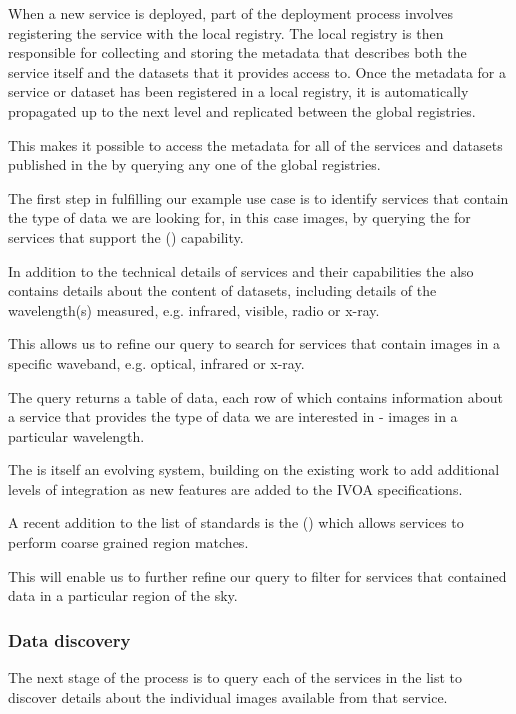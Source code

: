 \documentclass{article}
\begin{document}
When a new service is deployed, part of the deployment process involves
registering the service with the local registry.
The local registry is then responsible for collecting and storing the
metadata that describes both the service itself and the datasets that it
provides access to.
Once the metadata for a service or dataset has been registered in a local
registry, it is automatically propagated up to the next level and replicated
between the global registries.

This makes it possible to access the metadata for all of the services
and datasets published in the \cite{vo} by querying any one of the global
registries.

The first step in fulfilling our example use case is to identify services that
contain the type of data we are looking for, in this case images, by querying
the \cite{ivoa-reg} for services that support the 
(\cite{ivoa-sia}) capability.

In addition to the technical details of services and their capabilities
the \cite{ivoa-reg} also contains details about the content of datasets,
including details of the wavelength(s) measured, e.g. infrared, visible,
radio or x-ray.

This allows us to refine our query to search for \cite{ivoa-sia} services
that contain images in a specific waveband, e.g. optical, infrared or x-ray.

The \cite{ivoa-reg} query returns a table of data, each row of which contains
information about a \cite{ivoa-sia} service that provides the type of data
we are interested in - images in a particular wavelength.

The \cite{vo} is itself an evolving system, building on the existing work
to add additional levels of integration as new features are added to the
IVOA specifications.

A recent addition to the list of \cite{ivoa} standards is the
 (\cite{ivoa-moc}) which allows \cite{ivoa-reg}
services to perform coarse grained region matches.

This will enable us to further refine our \cite{ivoa-reg} query to filter
for \cite{ivoa-sia} services that contained data in a particular region of
the sky.

\subsubsection{Data discovery}

The next stage of the process is to query each of the \cite{ivoa-sia}
services in the list to discover details about the individual images
available from that service.
\end{document}

